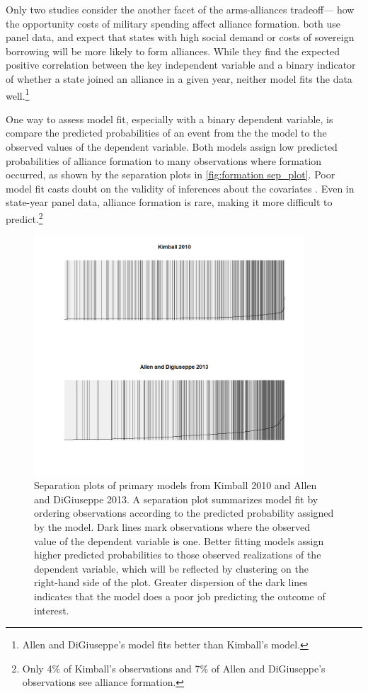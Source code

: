 \documentclass[12pt]{article}
\begin{document}
Only two studies consider the another facet of the arms-alliances tradeoff--- how the opportunity costs of military spending affect alliance formation. \citet{Kimball2010, AllenDigiuseppe2013} both use panel data, and expect that states with high social demand or costs of sovereign borrowing will be more likely to form alliances. While they find the expected positive correlation between the key independent variable and a binary indicator of whether a state joined an alliance in a given year, neither model fits the data well.\footnote{Allen and DiGiuseppe's model fits better than Kimball's model.} 

One way to assess model fit, especially with a binary dependent variable, is compare the predicted probabilities of an event from the the model to the observed values of the dependent variable. Both models assign low predicted probabilities of alliance formation to many observations where formation occurred, as shown by the separation plots in \autoref{fig:formation sep_plot}. Poor model fit casts doubt on the validity of inferences about the covariates \citep{Montgomeryetal2012, Muchlinskietal2015}. Even in state-year panel data, alliance formation is rare, making it more difficult to predict.\footnote{Only 4\% of Kimball's observations and 7\% of Allen and DiGiuseppe's observations see alliance formation.} 

\begin{figure}[htbp]
	\centering
		\includegraphics[width=0.90\textwidth]{formation sep_plot.png}
	\caption{Separation plots of primary models from Kimball 2010 and Allen and DiGiuseppe 2013. A separation plot summarizes model fit by ordering observations according to the predicted probability assigned by the model. Dark lines mark observations where the observed value of the dependent variable is one. Better fitting models assign higher predicted probabilities to those observed realizations of the dependent variable, which will be reflected by clustering on the right-hand side of the plot. Greater dispersion of the dark lines indicates that the model does a poor job predicting the outcome of interest.}
	\label{fig:formation sep_plot}
\end{figure}
\end{document}
